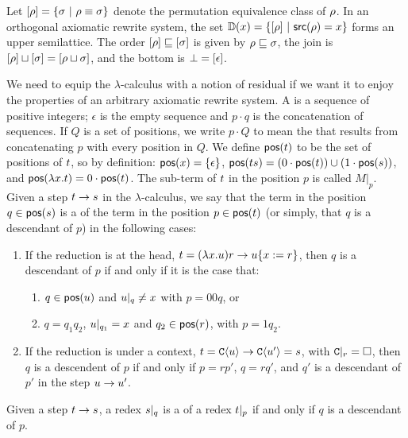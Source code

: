 Let ${[\rho]} = \{\sigma \ |\  \rho \equiv \sigma\}$
denote the permutation equivalence class of $\rho$.
In an orthogonal axiomatic rewrite system,
the set $\mathbb{D}(x) = \{{[\rho]} \ |\  \mathsf{src}(\rho) = x\}$
forms an upper semilattice.
The order ${[\rho]} \sqsubseteq {[\sigma]}$ is given by $\rho \sqsubseteq \sigma$,
the join is ${[\rho]} \sqcup {[\sigma]} = {[\rho \sqcup \sigma]}$,
and the bottom is $\bot = {[\epsilon]}$.

We need to equip the $\lambda$-calculus with a notion of residual if we want it to
enjoy the properties of an arbitrary axiomatic rewrite system.
A  is a sequence of positive integers; $\epsilon$ is the
empty sequence and $p \cdot q$ is the concatenation of sequences.
If $Q$ is a set of positions, we write $p \cdot Q$ to mean the that results from
concatenating $p$ with every position in $Q$.
We define $\mathsf{pos}(t)$ to be the set of positions of $t$, so by definition:
$\mathsf{pos}(x) = \{\epsilon\}$,
$\mathsf{pos}(t s) = (0 \cdot \mathsf{pos}(t)) \cup (1 \cdot \mathsf{pos}(s))$, and
$\mathsf{pos}(\lambda x. t) = 0 \cdot \mathsf{pos}(t)$.
The sub-term of $t$ in the position $p$ is called $M|_p$.
Given a step $t \to s$ in the $\lambda$-calculus, we say that
the term in the position $q \in \mathsf{pos}(s)$ is a  of the term
in the position $p \in \mathsf{pos}(t)$ (or simply, that $q$ is a descendant of $p$)
in the following cases:
\begin{enumerate}
  \item If the reduction is at the head,
    $t = (\lambda x. u) r \to u\{x := r\}$,
    then $q$ is a descendant of $p$ if and only if it is the case that:
    \begin{enumerate}
      \item $q \in \mathsf{pos}(u)$ and $u|_q \neq x$ with $p = 00q$, or
      \item $q = q_1 q_2$, $u|_{q_1} = x$ and $q_2 \in \mathsf{pos}(r)$,
        with $p=1q_2$.
    \end{enumerate}
  \item If the reduction is under a context,
    $t = \mathtt{C}\langle u\rangle \to \mathtt{C}\langle u'\rangle = s$, with $\mathtt{C}|_r = \Box$,
    then $q$ is a descendent of $p$ if and only if $p = rp'$, $q = rq'$, and
    $q'$ is a descendant of $p'$ in the step $u \to u'$.
\end{enumerate}
Given a step $t \to s$,
a redex $s|_q$ is a  of a redex $t|_p$
if and only if $q$ is a descendant of $p$.


